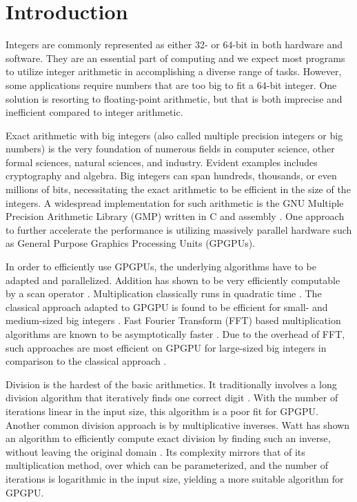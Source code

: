 \section{Introduction}
\label{sec:intro}

Integers are commonly represented as either 32- or 64-bit in both hardware and
software. They are an essential part of computing and we expect most programs to
utilize integer arithmetic in accomplishing a diverse range of tasks. However,
some applications require numbers that are too big to fit a 64-bit integer. One
solution is resorting to floating-point arithmetic, but that is both imprecise
and inefficient compared to integer arithmetic.

Exact arithmetic with big integers (also called multiple precision integers or
big numbers) is the very foundation of numerous fields in computer science,
other formal sciences, natural sciences, and industry. Evident examples includes
cryptography and algebra. Big integers can span hundreds, thousands, or even
millions of bits, necessitating the exact arithmetic to be efficient in the size
of the integers. A widespread implementation for such arithmetic is the GNU
Multiple Precision Arithmetic Library (GMP) written in C and assembly
\cite{GMP}. One approach to further accelerate the performance is utilizing
massively parallel hardware such as General Purpose Graphics Processing Units
(GPGPUs).

In order to efficiently use GPGPUs, the underlying algorithms have to be adapted
and parallelized. Addition has shown to be very efficiently computable by a scan
operator \cite{DPPproject,blellochaddscan}. Multiplication classically runs in
quadratic time \cite{knuth97}. The classical approach adapted to GPGPU is found
to be efficient for small- and medium-sized big integers
\cite{doi:10.1177/10943420221077964, oancea2024gpu}. Fast Fourier Transform
(FFT) based multiplication algorithms are known to be asymptotically faster
\cite{knuth97}. Due to the overhead of FFT, such approaches are most efficient
on GPGPU for large-sized big integers in comparison to the classical approach
\cite{Bantikyan2014BigIM, doi:10.1177/10943420221077964, oancea2024gpu}.

Division is the hardest of the basic arithmetics. It traditionally involves a
long division algorithm that iteratively finds one correct digit
\cite{knuth97}. With the number of iterations linear in the input size, this
algorithm is a poor fit for GPGPU. Another common division approach is by
multiplicative inverses. Watt has shown an algorithm to efficiently compute
exact division by finding such an inverse, without leaving the original domain
\cite{watt2023efficient}. Its complexity mirrors that of its multiplication
method, over which can be parameterized, and the number of iterations is
logarithmic in the input size, yielding a more suitable algorithm for
GPGPU.\bigskip

